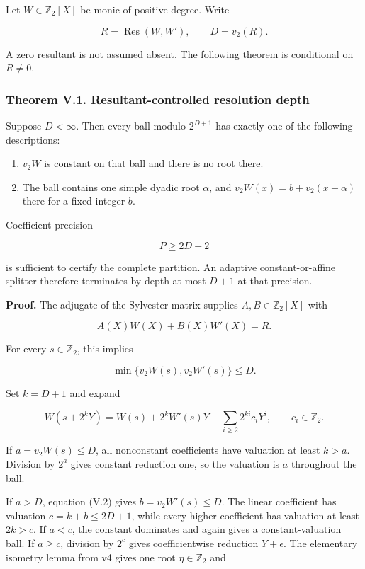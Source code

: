 \documentclass[11pt,letterpaper]{article}
\providecommand{\tightlist}{\setlength{\itemsep}{0pt}\setlength{\parskip}{0pt}}
\begin{document}
Let \(W\in\mathbb Z_2[X]\) be monic of positive degree. Write

\[
R=\operatorname{Res}(W,W'),\qquad D=v_2(R).
\]

A zero resultant is not assumed absent. The following theorem is conditional on \(R\ne0\).

\subsubsection{Theorem V.1. Resultant-controlled resolution depth}\label{theorem-v.1.-resultant-controlled-resolution-depth}

Suppose \(D<\infty\). Then every ball modulo \(2^{D+1}\) has exactly one of the following descriptions:

\begin{enumerate}
\def\labelenumi{\arabic{enumi}.}
\tightlist
\item
  \(v_2W\) is constant on that ball and there is no root there.
\item
  The ball contains one simple dyadic root \(\alpha\), and \(v_2W(x)=b+v_2(x-\alpha)\) there for a fixed integer \(b\).
\end{enumerate}

Coefficient precision

\[
\boxed{P\ge2D+2}
\]

is sufficient to certify the complete partition. An adaptive constant-or-affine splitter therefore terminates by depth at most \(D+1\) at that precision.

\textbf{Proof.} The adjugate of the Sylvester matrix supplies \(A,B\in\mathbb Z_2[X]\) with

\[
A(X)W(X)+B(X)W'(X)=R.
\]

For every \(s\in\mathbb Z_2\), this implies

\[
\min\{v_2W(s),v_2W'(s)\}\le D. \tag{V.2}
\]

Set \(k=D+1\) and expand

\[
W(s+2^kY)=W(s)+2^kW'(s)Y+
\sum_{i\ge2}2^{ki}c_iY^i,
\qquad c_i\in\mathbb Z_2.
\]

If \(a=v_2W(s)\le D\), all nonconstant coefficients have valuation at least \(k>a\). Division by \(2^a\) gives constant reduction one, so the valuation is \(a\) throughout the ball.

If \(a>D\), equation (V.2) gives \(b=v_2W'(s)\le D\). The linear coefficient has valuation \(c=k+b\le2D+1\), while every higher coefficient has valuation at least \(2k>c\). If \(a<c\), the constant dominates and again gives a constant-valuation ball. If \(a\ge c\), division by \(2^c\) gives coefficientwise reduction \(Y+\epsilon\). The elementary isometry lemma from v4 gives one root \(\eta\in\mathbb Z_2\) and
\end{document}
